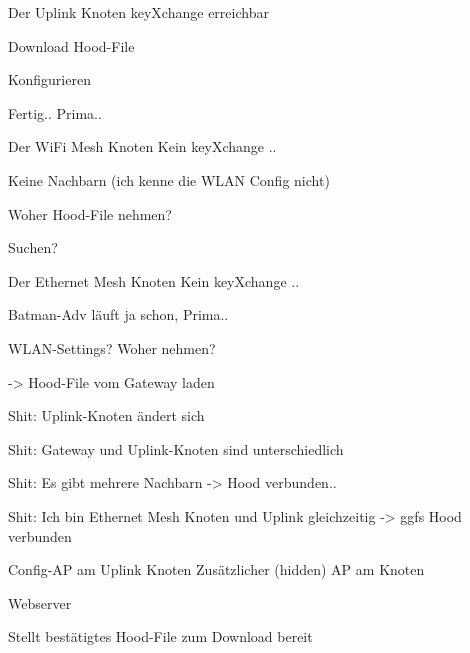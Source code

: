 \begin{frame}{Der Uplink Knoten}
    keyXchange erreichbar

    Download Hood-File

    Konfigurieren

    Fertig.. Prima..
\end{frame}

\begin{frame}{Der WiFi Mesh Knoten}
    Kein keyXchange ..

    Keine Nachbarn (ich kenne die WLAN Config nicht)

    Woher Hood-File nehmen?

    Suchen?
\end{frame}

\begin{frame}{Der Ethernet Mesh Knoten}
    Kein keyXchange ..

    Batman-Adv läuft ja schon, Prima..

    WLAN-Settings? Woher nehmen?
    
    -> Hood-File vom Gateway laden

    Shit: Uplink-Knoten ändert sich

    Shit: Gateway und Uplink-Knoten sind unterschiedlich

    Shit: Es gibt mehrere Nachbarn -> Hood verbunden..

    Shit: Ich bin Ethernet Mesh Knoten und Uplink gleichzeitig -> ggfs Hood verbunden
\end{frame}

\begin{frame}{Config-AP am Uplink Knoten}
    Zusätzlicher (hidden) AP am Knoten

    Webserver

    Stellt bestätigtes Hood-File zum Download bereit
\end{frame}
